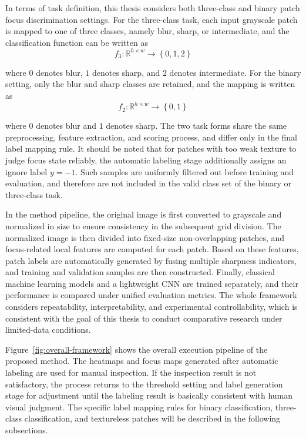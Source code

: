 \par In terms of task definition, this thesis considers both three-class and
binary patch focus discrimination settings. For the three-class task, each
input grayscale patch is mapped to one of three classes, namely blur, sharp,
or intermediate, and the classification function can be written as
\begin{equation}
    f_3: \mathbb{R}^{h\times w} \to \left\{ 0,1,2 \right\}
    \label{eq:3-Classification}
\end{equation}
\par where $0$ denotes blur, $1$ denotes sharp, and $2$ denotes intermediate.
For the binary setting, only the blur and sharp classes are retained, and the
mapping is written as
\begin{equation}
    f_2: \mathbb{R}^{h\times w} \to \left\{ 0,1 \right\}
    \label{eq:2-Classification}
\end{equation}
\par where $0$ denotes blur and $1$ denotes sharp. The two task forms share the
same preprocessing, feature extraction, and scoring process, and differ only
in the final label mapping rule. It should be noted that for patches with too
weak texture to judge focus state reliably, the automatic labeling stage
additionally assigns an ignore label $y=-1$. Such samples are uniformly
filtered out before training and evaluation, and therefore are not included in
the valid class set of the binary or three-class task.

\par In the method pipeline, the original image is first converted to grayscale
and normalized in size to ensure consistency in the subsequent grid division.
The normalized image is then divided into fixed-size non-overlapping patches,
and focus-related local features are computed for each patch. Based on these
features, patch labels are automatically generated by fusing multiple
sharpness indicators, and training and validation samples are then
constructed. Finally, classical machine learning models and a lightweight CNN
are trained separately, and their performance is compared under unified
evaluation metrics. The whole framework considers repeatability,
interpretability, and experimental controllability, which is consistent with
the goal of this thesis to conduct comparative research under limited-data
conditions.

\par Figure~\ref{fig:overall-framework} shows the overall execution pipeline of
the proposed method. The heatmaps and focus maps generated after automatic
labeling are used for manual inspection. If the inspection result is not
satisfactory, the process returns to the threshold setting and label
generation stage for adjustment until the labeling result is basically
consistent with human visual judgment. The specific label mapping rules for
binary classification, three-class classification, and textureless patches
will be described in the following subsections.

